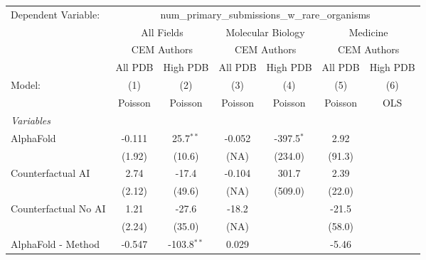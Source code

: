 \begingroup
\centering
\begin{tabular}{lcccccc}
   \tabularnewline \midrule \midrule
   Dependent Variable: & \multicolumn{6}{c}{num\_primary\_submissions\_w\_rare\_organisms}\\
 & \multicolumn{2}{c}{All Fields} & \multicolumn{2}{c}{Molecular Biology} & \multicolumn{2}{c}{Medicine} \\
\cmidrule(lr){2-3} \cmidrule(lr){4-5} \cmidrule(lr){6-7}
 & \multicolumn{2}{c}{CEM Authors} & \multicolumn{2}{c}{CEM Authors} & \multicolumn{2}{c}{CEM Authors} \\
\cmidrule(lr){2-3} \cmidrule(lr){4-5} \cmidrule(lr){6-7}
 & \multicolumn{1}{c}{All PDB} & \multicolumn{1}{c}{High PDB} & \multicolumn{1}{c}{All PDB} & \multicolumn{1}{c}{High PDB} & \multicolumn{1}{c}{All PDB} & \multicolumn{1}{c}{High PDB} \\
\cmidrule(lr){2-2} \cmidrule(lr){3-3} \cmidrule(lr){4-4} \cmidrule(lr){5-5} \cmidrule(lr){6-6} \cmidrule(lr){7-7}
   Model:                                                     & (1)      & (2)           & (3)                   & (4)          & (5)     & (6)\\  
                                                              &  Poisson & Poisson       & Poisson               & Poisson      & Poisson & OLS\\  
   \midrule
   \emph{Variables}\\
   AlphaFold                                                  & -0.111   & 25.7$^{**}$   & -0.052                & -397.5$^{*}$ & 2.92    &   \\   
                                                              & (1.92)   & (10.6)        & (NA)                  & (234.0)      & (91.3)  &   \\   
   Counterfactual AI                                          & 2.74     & -17.4         & -0.104                & 301.7        & 2.39    &   \\   
                                                              & (2.12)   & (49.6)        & (NA)                  & (509.0)      & (22.0)  &   \\   
   Counterfactual No AI                                       & 1.21     & -27.6         & -18.2                 &              & -21.5   &   \\   
                                                              & (2.24)   & (35.0)        & (NA)                  &              & (58.0)  &   \\   
   AlphaFold - Method                                         & -0.547   & -103.8$^{**}$ & 0.029                 &              & -5.46   &   \\   

\end{tabular}
